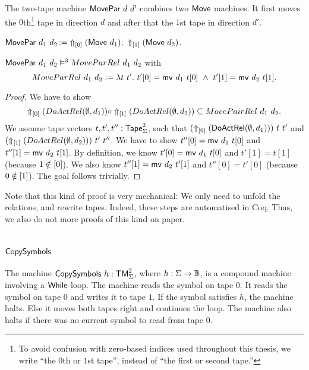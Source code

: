 The two-tape machine $\MS{MovePar}~d~d'$ combines two $\MS{Move}$ machines.  It first moves the $0$th\footnote{To avoid confusion with zero-based
  indices used throughout this thesis, we write ``the $0$th or $1$st tape'', instead of ``the first or second tape.''} tape in direction $d$ and after
that the $1$st tape in direction $d'$.
\begin{definition}[$\MS{MovePar}$]
  \label{def:MovePar}
  $\MS{MovePar}~d_1~d_2 \defop \LiftTapes{(\MS{Move}~d_1)}{\Vector{0}} \Seq \LiftTapes{(\MS{Move}~d_2)}{\Vector{1}}$.
\end{definition}
\begin{lemma}
  \label{lem:MovePar_Sem}
  $\MS{MovePar}~d_1~d_2 \vDash^3 MoveParRel~d_1~d_2$ with
  \[ MoveParRel~d_1~d_2 := \lambda t~t'.~t'[0]=\MS{mv}~d_1~t[0] ~\land~ t'[1]=\MS{mv}~d_2~t[1]. \]
\end{lemma}
\begin{proof}
  We have to show
  $$
    \LiftTapes{(DoActRel(\None,d_1))}{\Vector{0}} \circ
    \LiftTapes{(DoActRel(\None,d_2))}{\Vector{1}} \subseteq
    MovePairRel~d_1~d_2.
  $$
  We assume tape vectors $t, t', t'' : \Tape_\Sigma^2$, such that $(\LiftTapes{(\MS{DoActRel}(\None,d_1))}{\Vector{0}})~t~t'$ and \\
  $(\LiftTapes{(DoActRel(\None,d_2))}{\Vector{1}})~t'~t''$.  We have to show $t''[0]=\MS{mv}~d_1~t[0]$ and $t''[1]=\MS{mv}~d_2~t[1]$.  By definition,
  we know $t'[0]=\MS{mv}~d_1~t[0]$ and $t'[1]=t[1]$ (because $1 \notin \Vector{0}$).  We also know $t''[1]=\MS{mv}~d_2~t'[1]$ and $t''[0]=t'[0]$
  (because $0 \notin \Vector{1}$).  The goal follows trivially.
\end{proof}
Note that this kind of proof is very mechanical: We only need to unfold the relations, and rewrite tapes.  Indeed, these steps are automatised in Coq.
Thus, we also do not more proofs of this kind on paper.

\section{$\MS{CopySymbols}$}
\label{sec:CopySymbols}

The machine $\MS{CopySymbols}~h : \TM_\Sigma^2$, where $h:\Sigma\to\Bool$, is a compound machine involving a $\While$-loop.  The machine reads the
symbol on tape $0$.  It reads the symbol on tape $0$ and writes it to tape $1$.  If the symbol satisfies $h$, the machine halts.  Else it moves both
tapes right and continues the loop.  The machine also halts if there was no current symbol to read from tape $0$.

